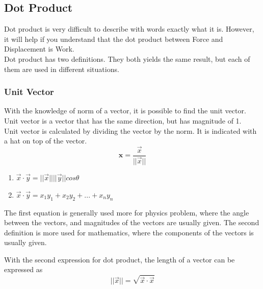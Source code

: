 \documentclass[12pt]{article}
\newcommand{\uvec}[1]{\boldsymbol{\hat{\textbf{#1}}}}
\begin{document}
\subsection{Dot Product}
Dot product is very difficult to describe with words exactly what it is. However, it will help if you understand that the dot product between Force and Displacement is Work.\\
Dot product has two definitions. They both yields the same result, but each of them are used in different situations.\\
\subsubsection{Unit Vector}
With the knowledge of norm of a vector, it is possible to find the unit vector. Unit vector is a vector that has the same direction, but has magnitude of 1.\\
Unit vector is calculated by dividing the vector by the norm. It is indicated with a hat on top of the vector.\\
\begin{equation}
\uvec{x} = \frac{\vec{x}}{||\vec{x}||}
\end{equation}

\begin{enumerate}
  \item $\vec{x}\cdot\vec{y} = ||\vec{x}|| ||\vec{y}|| cos\theta$
  \item $\vec{x}\cdot\vec{y} = x_1y_1 + x_2y_2 + ... +x_ny_n$
\end{enumerate}
The first equation is generally used more for physics problem, where the angle between the vectors, and magnitudes of the vectors are usually given. The second definition is more used for mathematics, where the components of the vectors is usually given.

With the second expression for dot product, the length of a vector can be expressed as 
\begin{equation}
||\vec{x}|| = \sqrt{\vec{x}\cdot\vec{x}}
\end{equation}
\end{document}
